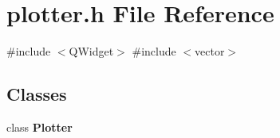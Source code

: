 \section{plotter.\+h File Reference}
\label{plotter_8h}
{\ttfamily \#include $<$Q\+Widget$>$}\newline
{\ttfamily \#include $<$vector$>$}\newline
\subsection*{Classes}
\begin{DoxyCompactItemize}
\item 
class \textbf{ Plotter}
\end{DoxyCompactItemize}
